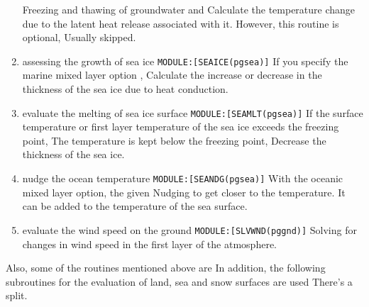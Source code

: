 \begin{enumerate}
  Freezing and thawing of groundwater and Calculate the temperature
  change due to the latent heat release associated with it. However,
  this routine is optional, Usually skipped.
\item
  assessing the growth of sea ice \texttt{MODULE:{[}SEAICE(pgsea){]}} If
  you specify the marine mixed layer option , Calculate the increase or
  decrease in the thickness of the sea ice due to heat conduction.
\item
  evaluate the melting of sea ice surface
  \texttt{MODULE:{[}SEAMLT(pgsea){]}} If the surface temperature or
  first layer temperature of the sea ice exceeds the freezing point, The
  temperature is kept below the freezing point, Decrease the thickness
  of the sea ice.
\item
  nudge the ocean temperature \texttt{MODULE:{[}SEANDG(pgsea){]}} With
  the oceanic mixed layer option, the given Nudging to get closer to the
  temperature. It can be added to the temperature of the sea surface.
\item
  evaluate the wind speed on the ground
  \texttt{MODULE:{[}SLVWND(pggnd){]}} Solving for changes in wind speed
  in the first layer of the atmosphere.
\end{enumerate}

Also, some of the routines mentioned above are In addition, the
following subroutines for the evaluation of land, sea and snow surfaces
are used There's a split.

